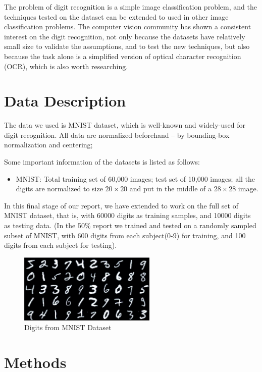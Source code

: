 \documentclass[12pt]{article}
\begin{document}
The problem of digit recognition is a simple image classification problem, and the techniques tested on the dataset can be extended to used in other image classification problems. The computer vision community has shown a consistent interest on the digit recognition, not only because the datasets have relatively small size to validate the assumptions, and to test the new techniques, but also because the task alone is a simplified version of optical character recognition (OCR), which is also worth researching. 


\section{Data Description}
\label{sec:data}
The data we used is MNIST dataset\cite{lecun1998gradient}, which is well-known and widely-used for digit recognition. All data are normalized beforehand -- by bounding-box normalization and centering;

Some important information of the datasets is listed as follows:
\begin{itemize}
\item MNIST: Total training set of 60,000 images; test set of 10,000 images; all the digits are normalized to size $20 \times 20$ and put in the middle of a $28 \times 28$ image.
\end{itemize}

In this final stage of our report, we have extended to work on the full set of MNIST dataset, that is, with 60000 digits as training samples, and 10000 digits as testing data. (In the 50\% report we trained and tested on a randomly sampled subset of MNIST, with 600 digits from each subject(0-9) for training, and 100 digits from each subject for testing). 

\begin{figure}[tbp]
	\centering
	\includegraphics[height = 1.3in]{MNIST}		
	\caption{Digits from MNIST Dataset}
\end{figure}

\section{Methods}
\label{sec:methods}
\end{document}
